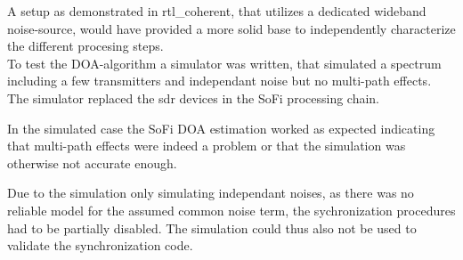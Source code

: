 A setup as demonstrated in rtl\_coherent\cite{rtlcoherent}, that
utilizes a dedicated wideband noise-source, would
have provided a more solid base to independently characterize
the different procesing steps. \\

To test the DOA-algorithm a simulator
was written, that simulated a spectrum
including a few transmitters and independant noise but no
multi-path effects.
The simulator replaced the \gls{sdr} devices in the
SoFi processing chain.

In the simulated case the SoFi DOA estimation
worked as expected indicating that multi-path
effects were indeed a problem or that the simulation
was otherwise not accurate enough.

Due to the simulation only simulating independant
noises, as there was no reliable model for the
assumed common noise term, the sychronization
procedures had to be partially disabled.
The simulation could thus also not be used
to validate the synchronization code. \\
